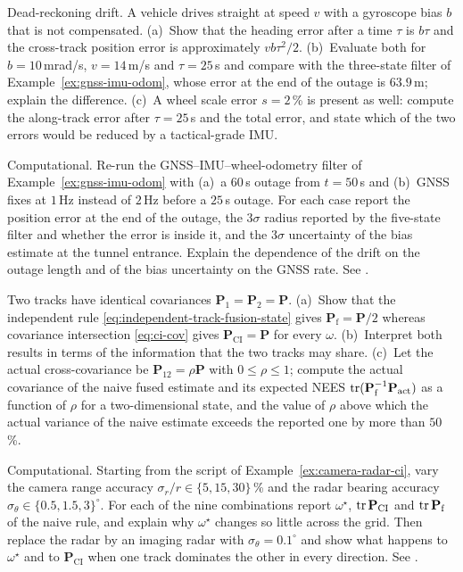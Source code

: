 \begin{prob}\label{prob:ch05:3}
Dead-reckoning drift. A vehicle drives straight at speed $v$ with a gyroscope bias $b$ that is not compensated. (a)~Show that the heading error after a time $\tau$ is $b\tau$ and the cross-track position error is approximately $vb\tau^{2}/2$. (b)~Evaluate both for $b=10$\,mrad/s, $v=14$\,m/s and $\tau=25$\,s and compare with the three-state filter of Example~\ref{ex:gnss-imu-odom}, whose error at the end of the outage is $63.9$\,m; explain the difference. (c)~A wheel scale error $s=2$\,\% is present as well: compute the along-track error after $\tau=25$\,s and the total error, and state which of the two errors would be reduced by a tactical-grade IMU.
\end{prob}

\begin{prob}\label{prob:ch05:4}
Computational. Re-run the GNSS--IMU--wheel-odometry filter of Example~\ref{ex:gnss-imu-odom} with (a)~a $60$\,s outage from $t=50$\,s and (b)~GNSS fixes at $1$\,Hz instead of $2$\,Hz before a $25$\,s outage. For each case report the position error at the end of the outage, the $3\sigma$ radius reported by the five-state filter and whether the error is inside it, and the $3\sigma$ uncertainty of the bias estimate at the tunnel entrance. Explain the dependence of the drift on the outage length and of the bias uncertainty on the GNSS rate. See .
\end{prob}

\begin{prob}\label{prob:ch05:5}
Two tracks have identical covariances $\mathbf{P}_{1}=\mathbf{P}_{2}=\mathbf{P}$. (a)~Show that the independent rule \eqref{eq:independent-track-fusion-state} gives $\mathbf{P}_{\mathrm{f}}=\mathbf{P}/2$ whereas covariance intersection \eqref{eq:ci-cov} gives $\mathbf{P}_{\mathrm{CI}}=\mathbf{P}$ for every $\omega$. (b)~Interpret both results in terms of the information that the two tracks may share. (c)~Let the actual cross-covariance be $\mathbf{P}_{12}=\rho\mathbf{P}$ with $0\le\rho\le1$; compute the actual covariance of the naive fused estimate and its expected NEES $\operatorname{tr}(\mathbf{P}_{\mathrm{f}}^{-1}\mathbf{P}_{\mathrm{act}})$ as a function of $\rho$ for a two-dimensional state, and the value of $\rho$ above which the actual variance of the naive estimate exceeds the reported one by more than $50$\,\%.
\end{prob}

\begin{prob}\label{prob:ch05:6}
Computational. Starting from the script of Example~\ref{ex:camera-radar-ci}, vary the camera range accuracy $\sigma_{r}/r\in\{5,15,30\}$\,\% and the radar bearing accuracy $\sigma_{\theta}\in\{0.5,1.5,3\}^{\circ}$. For each of the nine combinations report $\omega^{\star}$, $\operatorname{tr}\mathbf{P}_{\mathrm{CI}}$ and $\operatorname{tr}\mathbf{P}_{\mathrm{f}}$ of the naive rule, and explain why $\omega^{\star}$ changes so little across the grid. Then replace the radar by an imaging radar with $\sigma_{\theta}=0.1^{\circ}$ and show what happens to $\omega^{\star}$ and to $\mathbf{P}_{\mathrm{CI}}$ when one track dominates the other in every direction. See .
\end{prob}

